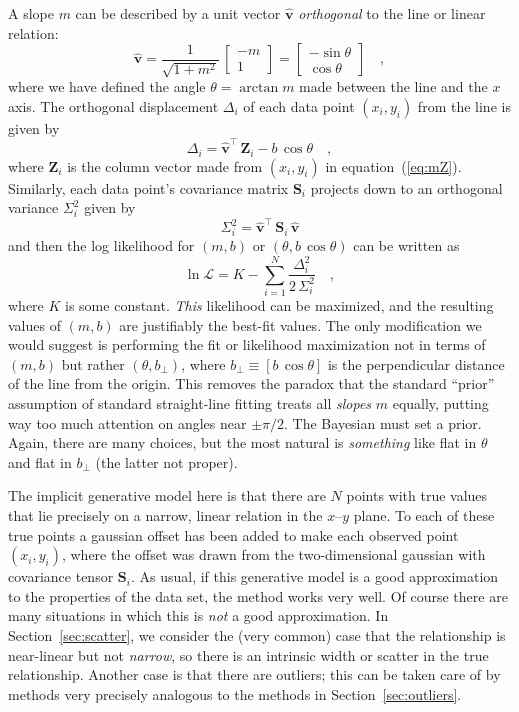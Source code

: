 \documentclass[12pt,twoside]{article}
\newcommand{\sectionname}{Section}
\newcommand{\equationname}{equation}
\newcommand{\mmatrix}[1]{\boldsymbol{#1}}
\newcommand{\transpose}[1]{{#1}^{\scriptscriptstyle \top}}
\newcommand{\mS}{\mmatrix{S}}
\newcommand{\mZ}{\mmatrix{Z}}
\newcommand{\vhat}{\mmatrix{\hat{v}}}
\newcommand{\like}{\mathscr{L}}
\newcommand{\bperp}{b_{\perp}}
\begin{document}
A slope $m$ can be described by a unit vector $\vhat$
\emph{orthogonal} to the line or linear relation:
\begin{equation}
\vhat
 = \frac{1}{\sqrt{1+m^2}}\,\left[\begin{array}{c}-m\\1\end{array}\right]
 = \left[\begin{array}{c}-\sin\theta\\\cos\theta\end{array}\right] \quad ,
\end{equation}
where we have defined the angle $\theta = \arctan m$ made between the
line and the $x$ axis.  The orthogonal displacement $\Delta_i$ of each
data point $(x_i,y_i)$ from the line is given by
\begin{equation}
\Delta_i = \transpose{\vhat}\,\mZ_i - b\,\cos\theta \quad ,
\end{equation}
where $\mZ_i$ is the column vector made from $(x_i,y_i)$ in
\equationname~(\ref{eq:mZ}).  Similarly, each data point's covariance
matrix $\mS_i$ projects down to an orthogonal variance $\Sigma_i^2$ given by
\begin{equation}\label{eq:Sigma}
\Sigma_i^2 = \transpose{\vhat}\,\mS_i\,\vhat
\end{equation}
and then the log likelihood for $(m,b)$ or $(\theta,b\,\cos\theta)$
can be written as
\begin{equation}\label{eq:twodlike}
\ln\like = K - \sum_{i=1}^N \frac{\Delta_i^2}{2\,\Sigma_{i}^2} \quad ,
\end{equation}
where $K$ is some constant.  \emph{This} likelihood can be maximized,
and the resulting values of $(m,b)$ are justifiably the best-fit
values.  The only modification we would suggest is performing the fit
or likelihood maximization not in terms of $(m,b)$ but rather
$(\theta,\bperp)$, where $\bperp\equiv[b\,\cos\theta]$ is the
perpendicular distance of the line from the origin.  This removes the
paradox that the standard ``prior'' assumption of standard
straight-line fitting treats all \emph{slopes} $m$ equally, putting
way too much attention on angles near $\pm\pi/2$.  The Bayesian must
set a prior.  Again, there are many choices, but the most natural
is \emph{something} like flat in $\theta$ and flat in $\bperp$ (the
latter not proper).

The implicit generative model here is that there are $N$ points with
true values that lie precisely on a narrow, linear relation in the
$x$--$y$ plane.  To each of these true points a gaussian offset has
been added to make each observed point $(x_i,y_i)$, where the offset
was drawn from the two-dimensional gaussian with covariance tensor
$\mS_i$.  As usual, if this generative model is a good approximation
to the properties of the data set, the method works very well.  Of
course there are many situations in which this is \emph{not} a good
approximation.  In \sectionname~\ref{sec:scatter}, we consider the
(very common) case that the relationship is near-linear but not
\emph{narrow}, so there is an intrinsic width or scatter in the true
relationship.  Another case is that there are outliers; this can be
taken care of by methods very precisely analogous to the methods in
\sectionname~\ref{sec:outliers}.
\end{document}
